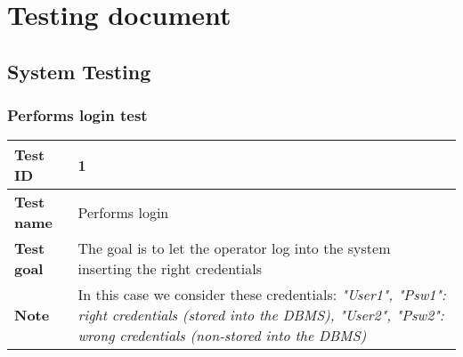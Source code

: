 \section{Testing document}{
	\subsection{System Testing}{
		\subsubsection{Performs login test}{
			\begin{center}
			\begin{tabular}{|p{4cm}|p{10cm}|}
			\hline
				\centering \vspace{1mm} \bfseries{Test ID} \vspace{1mm} & 
				\vspace{1mm} 1 \vspace{1mm}\\
			\hline
				\centering \vspace{1mm} \bfseries{Test name} \vspace{1mm} & 
				\vspace{1mm} Performs login \vspace{1mm}\\
			\hline
				\centering \vspace{1mm} \bfseries{Test goal} \vspace{1mm} & 
				\vspace{1mm} The goal is to let the operator log into the system inserting the right credentials \vspace{1mm}\\
			\hline
				\centering \vspace{1mm} \bfseries{Note} \vspace{1mm} & 
				\vspace{1mm} In this case we consider these credentials: \itshape{"User1", "Psw1"}: right credentials (stored into the DBMS), \itshape{"User2", "Psw2"}: wrong 	credentials (non-stored into the DBMS) \vspace{1mm}\\
			\hline
			\end{tabular}


\end{center}}}}
